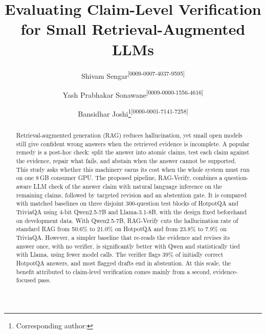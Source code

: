 \documentclass{svproc}
\newcommand{\orcidID}[1]{\textsuperscript{[#1]}}
\begin{document}
\mainmatter

\title{Evaluating Claim-Level Verification for Small Retrieval-Augmented LLMs}

\author{Shivam Sengar\orcidID{0009-0007-4037-9595}
\and Yash Prabhakar Sonawane\orcidID{0009-0000-1556-4616}
\and Bansidhar Joshi\thanks{Corresponding author: }\orcidID{0000-0001-7141-7258}}


\maketitle

\begin{abstract}
Retrieval-augmented generation (RAG) reduces hallucination, yet small open models still give confident wrong answers when the retrieved evidence is incomplete. A popular remedy is a post-hoc check: split the answer into atomic claims, test each claim against the evidence, repair what fails, and abstain when the answer cannot be supported. This study asks whether this machinery earns its cost when the whole system must run on one 8\,GB consumer GPU. The proposed pipeline, RAG-Verify, combines a question-aware LLM check of the answer claim with natural language inference on the remaining claims, followed by targeted revision and an abstention gate. It is compared with matched baselines on three disjoint 300-question test blocks of HotpotQA and TriviaQA using 4-bit Qwen2.5-7B and Llama-3.1-8B, with the design fixed beforehand on development data. With Qwen2.5-7B, RAG-Verify cuts the hallucination rate of standard RAG from 50.6\% to 21.0\% on HotpotQA and from 23.8\% to 7.9\% on TriviaQA. However, a simpler baseline that re-reads the evidence and revises its answer once, with no verifier, is significantly better with Qwen and statistically tied with Llama, using fewer model calls. The verifier flags 39\% of initially correct HotpotQA answers, and most flagged drafts end in abstention. At this scale, the benefit attributed to claim-level verification comes mainly from a second, evidence-focused pass.

\end{abstract}
\end{document}
